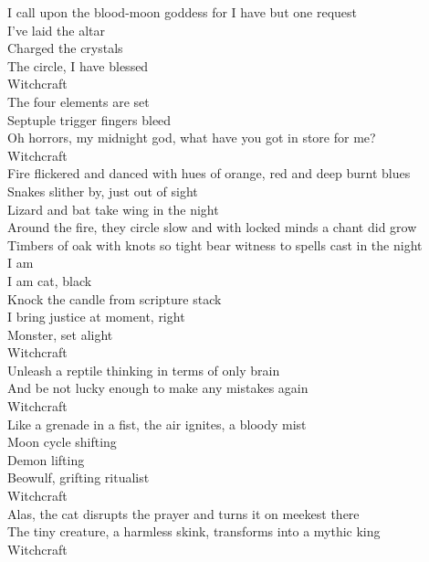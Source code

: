 I call upon the blood-moon goddess for I have but one request\\
I've laid the altar\\
Charged the crystals\\
The circle, I have blessed\\
Witchcraft\\
The four elements are set\\
Septuple trigger fingers bleed\\
Oh horrors, my midnight god, what have you got in store for me?\\
Witchcraft\\

Fire flickered and danced with hues of orange, red and deep burnt blues\\
Snakes slither by, just out of sight\\
Lizard and bat take wing in the night\\
Around the fire, they circle slow and with locked minds a chant did grow\\
Timbers of oak with knots so tight bear witness to spells cast in the night\\

I am \\
I am cat, black\\
Knock the candle from scripture stack\\
I bring justice at moment, right\\
 Monster, set alight\\
Witchcraft\\
Unleash a reptile thinking in terms of only  brain\\
And be not lucky enough to make any mistakes again\\
Witchcraft\\
Like a grenade in a fist, the air ignites, a bloody mist\\
Moon cycle shifting\\
Demon lifting\\
Beowulf, grifting ritualist\\
Witchcraft\\
Alas, the cat disrupts the prayer and turns it on meekest there\\
The tiny creature, a harmless skink, transforms into a mythic king\\
Witchcraft\\


